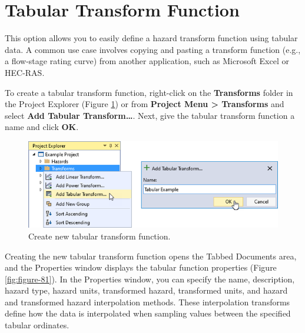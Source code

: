 \documentclass[
]{book}
\begin{document}
\hypertarget{tabular-transform-function}{%
\section{Tabular Transform Function}\label{tabular-transform-function}}

This option allows you to easily define a hazard transform function using tabular data. A common use case involves copying and pasting a transform function (e.g., a flow-stage rating curve) from another application, such as Microsoft Excel or HEC-RAS.

To create a tabular transform function, right-click on the \textbf{Transforms} folder in the Project Explorer (Figure \ref{fig:figure-80}) or from \textbf{Project Menu \textgreater{} Transforms} and select \textbf{Add Tabular Transform\ldots{}}. Next, give the tabular transform function a name and click \textbf{OK}.

\begin{figure}

{\centering \includegraphics{images/figure80} 

}

\caption{Create new tabular transform function.}\label{fig:figure-80}
\end{figure}

Creating the new tabular transform function opens the Tabbed Documents area, and the Properties window displays the tabular function properties (Figure \ref{fig:figure-81}). In the Properties window, you can specify the name, description, hazard type, hazard units, transformed hazard, transformed units, and hazard and transformed hazard interpolation methods. These interpolation transforms define how the data is interpolated when sampling values between the specified tabular ordinates.
\end{document}
